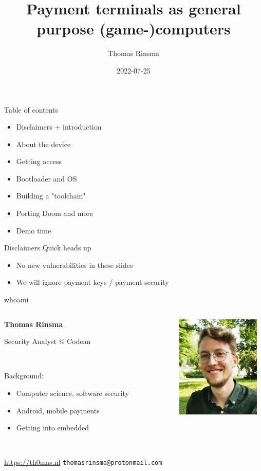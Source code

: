 \documentclass[12pt,aspectratio=169]{beamer}
\title{Payment terminals as general purpose (game-)computers}
\author{Thomas Rinsma}
\institute{MCH2022}
\date{2022-07-25}
\begin{document}
\frame{\titlepage}


\begin{frame}{Table of contents}
\begin{itemize}
	\item Disclaimers + introduction
	\item About the device
	\item Getting access
	\item Bootloader and OS
	\item Building a "toolchain"
	\item Porting Doom and more
	\item Demo time
\end{itemize}
\end{frame}

\begin{frame}{Disclaimers}
Quick heads up
\begin{itemize}
	\item No new vulnerabilities in these slides
	\item We will ignore payment keys / payment security
\end{itemize}
\end{frame}


\begin{frame}{whoami}
\begin{columns}
	\begin{column}{0.5\textwidth}
		{\large\textbf{Thomas Rinsma}}

		Security Analyst @ Codean
		
		~		

		Background:
		\begin{itemize}
			\item Computer science, software security
			\item Android, mobile payments
			\item Getting into embedded
		\end{itemize}
		
		~

		\url{https://th0mas.nl}
		\texttt{thomasrinsma@protonmail.com}
	\end{column}
	\begin{column}{0.5\textwidth}
		\centering
		\includegraphics[width=4cm]{media/parkfoto_crop}
	\end{column}
\end{columns}
\end{frame}
\end{document}
